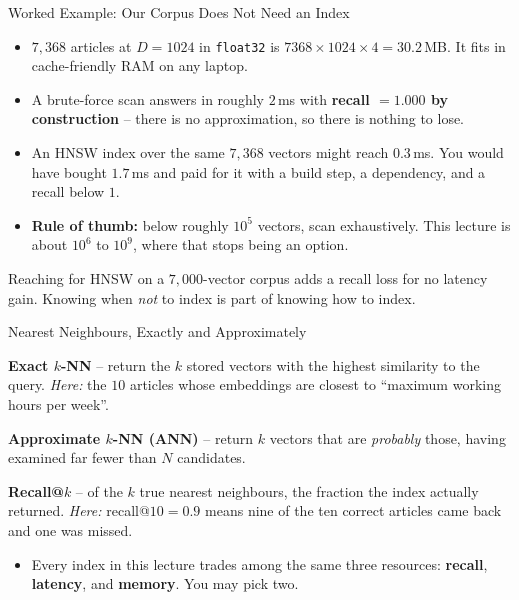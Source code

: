 \begin{frame}{Worked Example: Our Corpus Does Not Need an Index}
\begin{itemize}
  \item $7{,}368$ articles at $D = 1024$ in \texttt{float32} is $7368 \times 1024 \times 4 = 30.2$\,MB. It fits in cache-friendly RAM on any laptop.
  \pause
  \item A brute-force scan answers in roughly $2$\,ms with \textbf{recall $= 1.000$ by construction} -- there is no approximation, so there is nothing to lose.
  \pause
  \item An HNSW index over the same $7{,}368$ vectors might reach $0.3$\,ms. You would have bought $1.7$\,ms and paid for it with a build step, a dependency, and a recall below $1$.
  \pause
  \item \textbf{Rule of thumb:} below roughly $10^5$ vectors, scan exhaustively. This lecture is about $10^6$ to $10^9$, where that stops being an option.
\end{itemize}
\pause
\begin{rlpitfall}
Reaching for HNSW on a $7{,}000$-vector corpus adds a recall loss for no latency gain. Knowing when \emph{not} to index is part of knowing how to index.
\end{rlpitfall}
\end{frame}

\begin{frame}{Nearest Neighbours, Exactly and Approximately}
\begin{rldefinition}
\textbf{Exact $k$-NN} -- return the $k$ stored vectors with the highest similarity to the query. \emph{Here:} the $10$ articles whose embeddings are closest to ``maximum working hours per week''.

\smallskip
\textbf{Approximate $k$-NN (ANN)} -- return $k$ vectors that are \emph{probably} those, having examined far fewer than $N$ candidates.

\smallskip
\textbf{Recall@$k$} -- of the $k$ true nearest neighbours, the fraction the index actually returned. \emph{Here:} recall@$10 = 0.9$ means nine of the ten correct articles came back and one was missed.
\end{rldefinition}
\pause
\begin{itemize}
  \item Every index in this lecture trades among the same three resources: \textbf{recall}, \textbf{latency}, and \textbf{memory}. You may pick two.
\end{itemize}
\end{frame}

